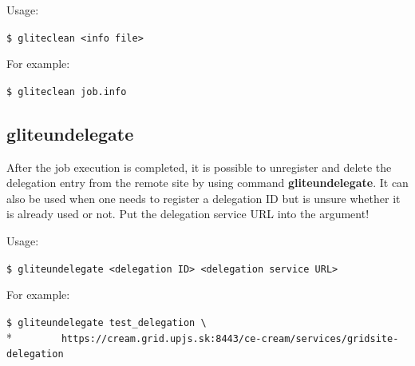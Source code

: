 \documentclass{article}
\begin{document}
Usage:
\begin{shaded}\verb#$ gliteclean <info file>#\end{shaded}%
For example:
\begin{shaded}\verb#$ gliteclean job.info#\end{shaded}%

\subsection{gliteundelegate}
\label{gliteundelegate}
After the job execution is completed, it is possible to unregister and delete the delegation entry from the remote site by using command \textbf{gliteundelegate}. It can also be used when one needs to register a delegation ID but is unsure whether it is already used or not. Put the delegation service URL into the argument!

Usage:
\begin{shaded}\verb#$ gliteundelegate <delegation ID> <delegation service URL>#\end{shaded}%
For example:
\begin{shaded}\verb#$ gliteundelegate test_delegation \#\\*
\verb#        https://cream.grid.upjs.sk:8443/ce-cream/services/gridsite-delegation#\end{shaded}%
\end{document}
